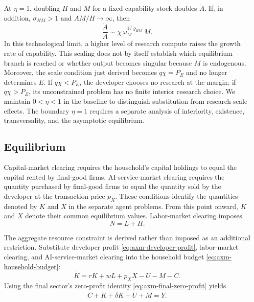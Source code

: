 \begin{remark}
\label{rem:axm-eta-one}
At \(\eta=1\), doubling \(H\) and \(M\) for a fixed capability stock doubles
\(\dot A\). If, in addition, \(\sigma_{HM}>1\) and \(AM/H\to\infty\), then
\[
 \frac{\dot A}{A}
 \sim \chi\,\omega_M^{1/\varrho_{HM}}M.
\]
In this technological limit, a higher level of research compute raises the
growth rate of capability. This scaling does not by itself establish which
equilibrium branch is reached or whether output becomes singular because \(M\)
is endogenous. Moreover, the scale condition just derived becomes
\(q\chi=P_E\) and no longer determines \(E\). If \(q\chi<P_E\), the developer
chooses no research at the margin; if \(q\chi>P_E\), its unconstrained problem
has no finite interior research choice. We maintain \(0<\eta<1\) in the
baseline to distinguish substitution from research-scale effects. The boundary
\(\eta=1\) requires a separate analysis of interiority, existence,
transversality, and the asymptotic equilibrium.
\end{remark}

\subsection{Equilibrium}

Capital-market clearing requires the household's capital holdings to equal the
capital rented by final-good firms. AI-service-market clearing requires the
quantity purchased by final-good firms to equal the quantity sold by the
developer at the transaction price \(p_X\). These conditions identify the
quantities denoted by \(K\) and \(X\) in the separate agent problems. From this
point onward, \(K\) and \(X\) denote their common equilibrium values. Labor-market
clearing imposes
\begin{equation}
 N=L+H.
 \label{eq:axm-labor-market}
\end{equation}

The aggregate resource constraint is derived rather than imposed as an
additional restriction. Substitute developer profit
\eqref{eq:axm-developer-profit}, labor-market clearing, and AI-service-market
clearing into the household budget \eqref{eq:axm-household-budget}:
\begin{equation}
 \dot K=rK+wL+p_XX-U-M-C.
 \label{eq:axm-capital-aggregation-step}
\end{equation}
Using the final sector's zero-profit identity
\eqref{eq:axm-final-zero-profit} yields
\begin{equation}
 C+\dot K+\delta K+U+M=Y.
 \label{eq:axm-resource}
\end{equation}


